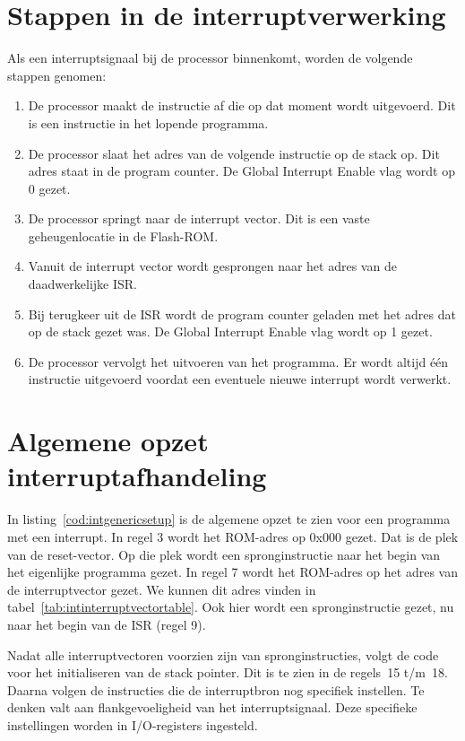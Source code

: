 \section{Stappen in de interruptverwerking}
Als een interruptsignaal bij de processor binnenkomt, worden de volgende
stappen genomen:
\begin{enumerate}
\item De processor maakt de instructie af die op dat moment wordt uitgevoerd.
      Dit is een instructie in het lopende programma.
\item De processor slaat het adres van de volgende instructie op de stack op.
      Dit adres staat in de program counter. De Global Interrupt Enable vlag
      wordt op 0 gezet.
\item De processor springt naar de interrupt vector. Dit is een vaste
      geheugenlocatie in de Flash-ROM.
\item Vanuit de interrupt vector wordt gesprongen naar het adres van de
      daadwerkelijke ISR.
\item Bij terugkeer uit de ISR wordt de program counter geladen met het adres
      dat op de stack gezet was. De Global Interrupt Enable vlag wordt op 1
      gezet.
\item De processor vervolgt het uitvoeren van het programma. Er wordt altijd
      \'e\'en instructie uitgevoerd voordat een eventuele nieuwe interrupt
      wordt verwerkt.
\end{enumerate}


\section{Algemene opzet interruptafhandeling}
In listing~\ref{cod:intgenericsetup} is de algemene opzet te zien voor een
programma met een interrupt. In regel 3 wordt het ROM-adres op 0x000 gezet.
Dat is de plek van de reset-vector. Op die plek wordt een spronginstructie
naar het begin van het eigenlijke programma gezet. In regel 7 wordt het
ROM-adres op het adres van de interruptvector gezet. We kunnen dit adres
vinden in tabel~\ref{tab:intinterruptvectortable}. Ook hier wordt een
spronginstructie gezet, nu naar het begin van de ISR (regel 9).

Nadat alle interruptvectoren voorzien zijn van spronginstructies, volgt de
code voor het initialiseren van de stack pointer. Dit is te zien in de
regels~15 t/m~18. Daarna volgen de instructies die de interruptbron nog
specifiek instellen. Te denken valt aan flankgevoeligheid van het interruptsignaal.
Deze specifieke instellingen worden in I/O-registers ingesteld.


